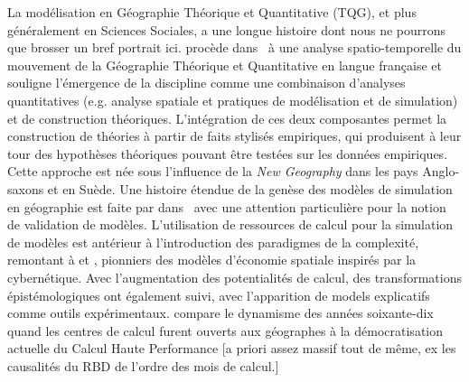 {}{
La modélisation en Géographie Théorique et Quantitative (TQG), et plus généralement en Sciences Sociales, a une longue histoire dont nous ne pourrons que brosser un bref portrait ici. 
 procède dans~\cite{cuyala2014analyse} à une analyse spatio-temporelle du mouvement de la Géographie Théorique et Quantitative en langue française et souligne l'émergence de la discipline comme une combinaison d'analyses quantitatives (e.g. analyse spatiale et pratiques de modélisation et de simulation) et de construction théoriques. 
L'intégration de ces deux composantes permet la construction de théories à partir de faits stylisés empiriques, qui produisent à leur tour des hypothèses théoriques pouvant être testées sur les données empiriques. Cette approche est née sous l'influence de la \emph{New Geography} dans les pays Anglo-saxons et en Suède. Une histoire étendue de la genèse des modèles de simulation en géographie est faite par  dans~\cite{rey2015plateforme} avec une attention particulière pour la notion de validation de modèles. L'utilisation de ressources de calcul pour la simulation de modèles est antérieur à l'introduction des paradigmes de la complexité, remontant à  
 et , 
  pionniers des modèles d'économie spatiale inspirés par la cybernétique. Avec l'augmentation des potentialités de calcul, des transformations épistémologiques ont également suivi, avec l'apparition de models explicatifs comme outils expérimentaux.  compare le dynamisme des années soixante-dix quand les centres de calcul furent ouverts aux géographes à la démocratisation actuelle du Calcul Haute Performance [a priori assez massif tout de même, ex les causalités du RBD de l'ordre des mois de calcul.]
}
